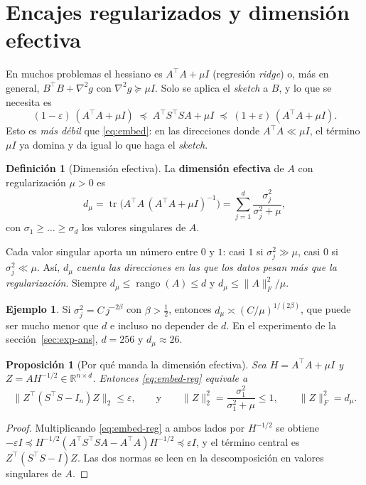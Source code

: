 \documentclass[11pt,a4paper,oneside]{book}
\newtheorem{proposicion}[teorema]{Proposición}
\theoremstyle{definition}
\newtheorem{definicion}[teorema]{Definición}
\newtheorem{ejemplo}[teorema]{Ejemplo}
\theoremstyle{remark}
\newcommand{\R}{\mathbb{R}}
\newcommand{\T}{^{\top}}
\newcommand{\eps}{\varepsilon}
\newcommand{\nrm}[1]{\lVert #1\rVert}
\DeclareMathOperator{\tr}{tr}
\DeclareMathOperator{\rank}{rango}
\newcommand{\dmu}{d_{\mu}}
\begin{document}
\section{Encajes regularizados y dimensión efectiva}\label{sec:dim-efectiva}

En muchos problemas el hessiano es $A\T A+\mu I$ (regresión \emph{ridge}) o, más en general,
$B\T B+\nabla^2 g$ con $\nabla^2 g\succeq\mu I$. Solo se aplica el \emph{sketch} a $B$, y lo que se necesita es
\begin{equation}\label{eq:embed-reg}
  (1-\eps)\,(A\T A+\mu I)\;\preceq\;A\T S\T SA+\mu I\;\preceq\;(1+\eps)\,(A\T A+\mu I).
\end{equation}
Esto es \emph{más débil} que \eqref{eq:embed}: en las direcciones donde $A\T A\ll\mu I$, el término $\mu I$ ya
domina y da igual lo que haga el \emph{sketch}.

\begin{definicion}[Dimensión efectiva]\label{def:dim-efectiva}
La \textbf{dimensión efectiva} de $A$ con regularización $\mu>0$ es
\[ \dmu=\tr\bigl(A\T A\,(A\T A+\mu I)^{-1}\bigr)=\sum_{j=1}^d\frac{\sigma_j^2}{\sigma_j^2+\mu}, \]
con $\sigma_1\ge\dots\ge\sigma_d$ los valores singulares de $A$.
\end{definicion}

Cada valor singular aporta un número entre $0$ y $1$: casi $1$ si $\sigma_j^2\gg\mu$, casi $0$ si
$\sigma_j^2\ll\mu$. Así, $\dmu$ \emph{cuenta las direcciones en las que los datos pesan más que la
regularización}. Siempre $\dmu\le\rank(A)\le d$ y $\dmu\le\nrm{A}_F^2/\mu$.

\begin{ejemplo}
Si $\sigma_j^2=C\,j^{-2\beta}$ con $\beta>\tfrac12$, entonces $\dmu\asymp(C/\mu)^{1/(2\beta)}$, que puede ser
mucho menor que $d$ e incluso no depender de $d$. En el experimento de la sección~\ref{sec:exp-ans},
$d=256$ y $\dmu\approx26$.
\end{ejemplo}

\begin{proposicion}[Por qué manda la dimensión efectiva]\label{prop:embed-reg}
Sea $H=A\T A+\mu I$ y $Z=AH^{-1/2}\in\R^{n\times d}$. Entonces \eqref{eq:embed-reg} equivale a
\[ \nrm{Z\T(S\T S-I_n)Z}_2\le\eps,\qquad\text{y}\qquad\nrm{Z}_2^2=\frac{\sigma_1^2}{\sigma_1^2+\mu}\le1,\qquad\nrm{Z}_F^2=\dmu . \]
\end{proposicion}

\begin{proof}
Multiplicando \eqref{eq:embed-reg} a ambos lados por $H^{-1/2}$ se obtiene
$-\eps I\preceq H^{-1/2}(A\T S\T SA-A\T A)H^{-1/2}\preceq\eps I$, y el término central es $Z\T(S\T S-I)Z$. Las dos
normas se leen en la descomposición en valores singulares de $A$.
\end{proof}
\end{document}
